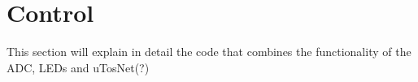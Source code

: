 \section{Control}
This section will explain in detail the code that combines the functionality of the ADC, LEDs and uTosNet(?)